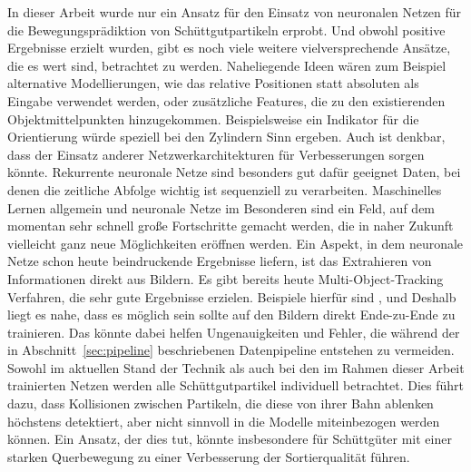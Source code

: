 In dieser Arbeit wurde nur ein Ansatz für den Einsatz von neuronalen Netzen für die Bewegungsprädiktion von Schüttgutpartikeln erprobt.
Und obwohl positive Ergebnisse erzielt wurden, gibt es noch viele weitere vielversprechende Ansätze, die es wert sind, betrachtet zu werden.
Naheliegende Ideen wären zum Beispiel alternative Modellierungen, wie das relative Positionen statt absoluten als Eingabe verwendet werden, 
oder zusätzliche Features, die zu den existierenden Objektmittelpunkten hinzugekommen.
Beispielsweise ein Indikator für die Orientierung würde speziell bei den Zylindern Sinn ergeben.
Auch ist denkbar, dass der Einsatz anderer Netzwerkarchitekturen für Verbesserungen sorgen könnte. 
Rekurrente neuronale Netze sind besonders gut dafür geeignet Daten, bei denen die zeitliche Abfolge wichtig ist sequenziell zu verarbeiten.
Maschinelles Lernen allgemein und neuronale Netze im Besonderen sind ein Feld, auf dem momentan sehr schnell große Fortschritte gemacht werden,
die in naher Zukunft vielleicht ganz neue Möglichkeiten eröffnen werden.
Ein Aspekt, in dem neuronale Netze schon heute beindruckende Ergebnisse liefern, ist das Extrahieren von Informationen direkt aus Bildern.
Es gibt bereits heute Multi-Object-Tracking Verfahren, die sehr gute Ergebnisse erzielen. 
Beispiele hierfür sind \cite{Milan2017}, \cite{son2017multi} und \cite{ning2017spatially}
Deshalb liegt es nahe, dass es möglich sein sollte auf den Bildern direkt Ende-zu-Ende zu trainieren.
Das könnte dabei helfen Ungenauigkeiten und Fehler, die während der in Abschnitt~\ref{sec:pipeline} beschriebenen Datenpipeline entstehen zu vermeiden.
\newline
Sowohl im aktuellen Stand der Technik als auch bei den im Rahmen dieser Arbeit trainierten Netzen werden alle Schüttgutpartikel individuell betrachtet.
Dies führt dazu, dass Kollisionen zwischen Partikeln, die diese von ihrer Bahn ablenken höchstens detektiert, aber nicht sinnvoll in die Modelle miteinbezogen werden können.
Ein Ansatz, der dies tut, könnte insbesondere für Schüttgüter mit einer starken Querbewegung zu einer Verbesserung der Sortierqualität führen.



